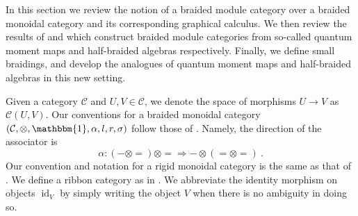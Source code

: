 \documentclass[12pt,dvipsnames]{article}
\numberwithin{equation}{section}
\theoremstyle{definition}
\newcommand{\cat}[1]{\mathcal{#1}}
\newcommand{\1}{\ensuremath{\mathbbm{1}}}
\DeclareMathOperator{\Id}{id}
\newcommand{\blank}{{-}}
\newcommand{\bblank}{{=}}
\begin{document}
In this section we review the notion of a braided module category over a braided monoidal category and its corresponding graphical calculus. We then review the results of \cite{BBJ16} and \cite{JR21} which construct braided module categories from so-called quantum moment maps and half-braided algebras respectively. Finally, we define small braidings, and develop the analogues of quantum moment maps and half-braided algebras in this new setting.

Given a category $\cat{C}$ and $U,V \in \cat{C}$, we denote the space of morphisms $U\to V$ as $\cat{C}(U,V)$. Our conventions for a braided monoidal category $(\cat{C},\otimes,\1,\alpha,l,r,\sigma)$ follow those of \cite[Chs.~XI-XIII]{Ka95}. Namely, the direction of the associator is
\begin{equation}
    \alpha: (\blank\otimes\bblank)\otimes\bblank \Rightarrow \blank\otimes(\bblank\otimes\bblank)
    \ .
\end{equation}
Our convention and notation for a rigid monoidal category is the same as that of \cite[Sec.\,2.10]{EGNO15}. We define a ribbon category as in \cite[Def.\,8.10.1]{EGNO15}. We abbreviate the identity morphism on objects $\Id_V$ by simply writing the object $V$ when there is no ambiguity in doing so.
\end{document}
